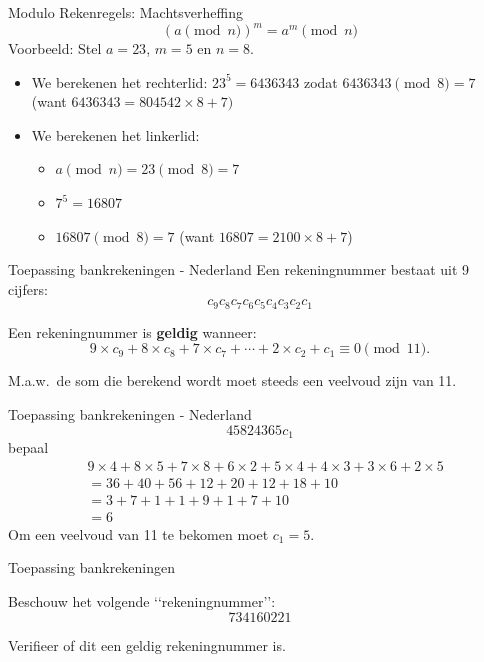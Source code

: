 \documentclass{beamer}
\begin{document}
\begin{frame}{Modulo Rekenregels: Machtsverheffing}
	\[ (a \pmod{n})^m  =  a^m  \pmod{n}\]
	\vspace{0.5cm}
	Voorbeeld: Stel $a = 23$, $m = 5$ en $n = 8$.
		\begin{itemize}
		\pause \item We berekenen het rechterlid: $23^5 = 6436343$ zodat $6436343 \pmod 8 = 7$ 
		(want $6436343 = 804542 \times 8 + 7)$
		\pause \item We berekenen het linkerlid:
		\begin{itemize}
			\pause\item $a \pmod n = 23 \pmod{8} = 7$
			\pause\item $7^5 = 16807$
			\pause \item $16807 \pmod{8} = 7$ (want $16807 =2100 \times 8 + 7$)
		\end{itemize}
	\end{itemize}
	
\end{frame}

\begin{frame}{Toepassing bankrekeningen - Nederland}
Een rekeningnummer bestaat uit 9 cijfers:
	\[ c_9c_8c_7c_6c_5c_4c_3c_2c_1\]
	
Een rekeningnummer is \textbf{geldig} wanneer:
\[
9\times c_9 + 8\times c_8 + 7\times c_7 + \cdots + 2\times c_2 + c_1 \equiv 0 \pmod{11}.
\]	
	
M.a.w.\ de som die berekend wordt moet steeds een veelvoud zijn van 11.
\end{frame}

\begin{frame}{Toepassing bankrekeningen - Nederland}
	\[ 45824365c_1\]
	bepaal
	\begin{align*}
& 	 9 \times 4 + 8 \times 5 + 7\times 8 + 6\times 2 + 5\times 4 + 4\times 3 + 3\times 6 +  2 \times 5 \\
 & = 36 + 40 + 56 + 12 + 20 +12 + 18 + 10 \\
 & = 3 + 7 + 1 + 1 + 9 + 1 + 7 + 10 \\
 & =6
	 \end{align*}
Om een veelvoud van 11 te bekomen moet $c_1 = 5$.	
\end{frame}

\begin{frame}{Toepassing bankrekeningen}

Beschouw het volgende \lq\lq rekeningnummer\rq\rq:
\[
734160221
\]

Verifieer of dit een geldig rekeningnummer is.

\end{frame}
\end{document}
